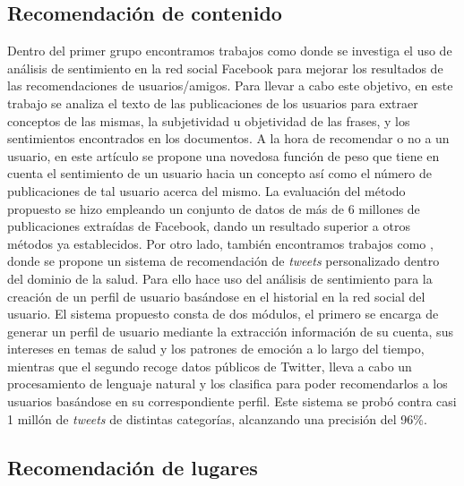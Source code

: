 \subsection{Recomendación de contenido}

Dentro del primer grupo encontramos trabajos como \cite{sent_analysis_facebook_user_recom} donde se investiga el uso de análisis de sentimiento en la red social Facebook para mejorar los resultados de las recomendaciones de usuarios/amigos. Para llevar a cabo este objetivo, en este trabajo se analiza el texto de las publicaciones de los usuarios para extraer conceptos de las mismas, la subjetividad u objetividad de las frases, y los sentimientos encontrados en los documentos. A la hora de recomendar o no a un usuario, en este artículo se propone una novedosa función de peso que tiene en cuenta el sentimiento de un usuario hacia un concepto así como el número de publicaciones de tal usuario acerca del mismo. La evaluación del método propuesto se hizo empleando un conjunto de datos de más de 6 millones de publicaciones extraídas de Facebook, dando un resultado superior a otros métodos ya establecidos. Por otro lado, también encontramos trabajos como \cite{pers_tweet_recomendation}, donde se propone un sistema de recomendación de \textit{tweets} personalizado dentro del dominio de la salud. Para ello hace uso del análisis de sentimiento para la creación de un perfil de usuario basándose en el historial en la red social del usuario. El sistema propuesto consta de dos módulos, el primero se encarga de generar un perfil de usuario mediante la extracción información de su cuenta, sus intereses en temas de salud y los patrones de emoción a lo largo del tiempo, mientras que el segundo recoge datos públicos de Twitter, lleva a cabo un procesamiento de lenguaje natural y los clasifica para poder recomendarlos a los usuarios basándose en su correspondiente perfil. Este sistema se probó contra casi 1 millón de \textit{tweets} de distintas categorías, alcanzando una precisión del 96\%.\\

\subsection{Recomendación de lugares}

